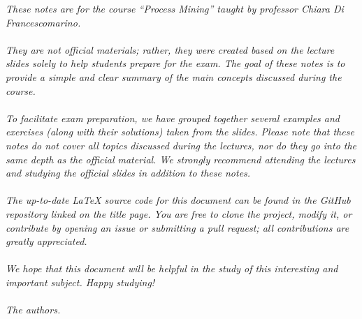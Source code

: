 \textit{
These notes are for the course ``Process Mining'' taught by professor Chiara Di Francescomarino. \\\\
They are not official materials; rather, they were created based on the lecture slides solely to help students prepare for the exam. 
The goal of these notes is to provide a simple and clear summary of the main concepts discussed during the course.\\\\
To facilitate exam preparation, we have grouped together several examples and exercises (along with their solutions) taken from the slides. 
Please note that these notes do not cover all topics discussed during the lectures, nor do they go into the same depth as the official material. 
We strongly recommend attending the lectures and studying the official slides in addition to these notes. \\\\
The up-to-date \LaTeX{} source code for this document can be found in the GitHub repository linked on the title page.
You are free to clone the project, modify it, or contribute by opening an issue or submitting a pull request; 
all contributions are greatly appreciated. \\\\
We hope that this document will be helpful in the study of this interesting and important subject. Happy studying! \\\\
The authors.
}